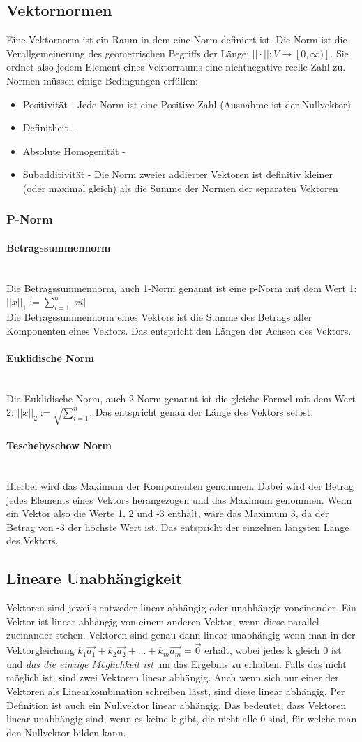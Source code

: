 \documentclass{article}
\newcommand{\paragraphlb}[1]{\paragraph{#1}\mbox{}\\}
\begin{document}
	\subsection{Vektornormen}
	Eine Vektornorm ist ein Raum in dem eine Norm definiert ist. Die Norm ist die Verallgemeinerung des geometrischen Begriffs der Länge: $||\cdot||:V\rightarrow [0, \infty)]$. Sie ordnet also jedem Element eines Vektorraums eine nichtnegative reelle Zahl zu. \\
	Normen müssen einige Bedingungen erfüllen:
	\begin{itemize}
		\item{Positivität - Jede Norm ist eine Positive Zahl (Ausnahme ist der Nullvektor)}
		\item{Definitheit - }
		\item{Absolute Homogenität - }
		\item{Subadditivität - Die Norm zweier addierter Vektoren ist definitiv kleiner (oder maximal gleich) als die Summe der Normen der separaten Vektoren}
	\end{itemize}
	\subsubsection{P-Norm}

	\paragraphlb{Betragssummennorm}
	Die Betragssummennorm, auch 1-Norm genannt ist eine p-Norm mit dem Wert 1: $||x||_1:=\sum_{i=1}^{n}|xi|$ \\
	Die Betragssummennorm eines Vektors ist die Summe des Betrags aller Komponenten eines Vektors. Das entspricht den Längen der Achsen des Vektors.
	\paragraphlb{Euklidische Norm}
	Die Euklidische Norm, auch 2-Norm genannt ist die gleiche Formel mit dem Wert 2: $||x||_2:=\sqrt{\sum_{i=1}^{n}}$. Das entspricht genau der Länge des Vektors selbst.
	\paragraphlb{Teschebyschow Norm}
	Hierbei wird das Maximum der Komponenten genommen. Dabei wird der Betrag jedes Elements eines Vektors herangezogen und das Maximum genommen. Wenn ein Vektor also die Werte 1, 2 und -3 enthält, wäre das Maximum 3, da der Betrag von -3 der höchste Wert ist. Das entspricht der einzelnen längsten Länge des Vektors.
	\subsection{Lineare Unabhängigkeit}
	Vektoren sind jeweils entweder linear abhängig oder unabhängig voneinander. Ein Vektor ist linear abhängig von einem anderen Vektor, wenn diese parallel zueinander stehen. Vektoren sind genau dann linear unabhängig wenn man in der Vektorgleichung $k_1 \vec{a_1}+k_2 \vec{a_2}+...+k_m \vec{a_m}=\vec{0}$ erhält, wobei jedes k gleich 0 ist und \textit{das die einzige Möglichkeit ist} um das Ergebnis zu erhalten. Falls das nicht möglich ist, sind zwei Vektoren linear abhängig. Auch wenn sich nur einer der Vektoren als Linearkombination schreiben lässt, sind diese linear abhängig. Per Definition ist auch ein Nullvektor linear abhängig. Das bedeutet, dass Vektoren linear unabhängig sind, wenn es keine k gibt, die nicht alle 0 sind, für welche man den Nullvektor bilden kann.
\end{document}
